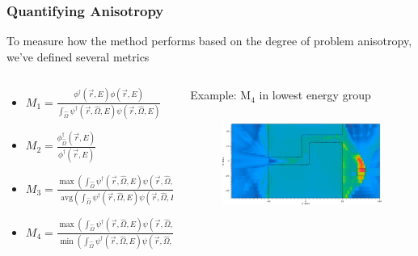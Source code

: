 \documentclass[xcolor=x11names,compress]{beamer}
\renewcommand{\(}{\begin{columns}}
\renewcommand{\)}{\end{columns}}
\newcommand{\<}[1]{\begin{column}{#1}}
\renewcommand{\>}{\end{column}}
\newcommand{\vOmega}{\ensuremath{\hat{\Omega}}}
\newcommand{\vecr}{\vec{r}}
\begin{document}
\begin{frame}[fragile]

  \frametitle{Quantifying Anisotropy}
  
  To measure how the method performs based on the degree of problem anisotropy, we've defined several metrics
  \vspace*{1em}
    \begin{columns}
    \begin{column}{0.45\textwidth}
      \begin{itemize}
      \item $M_{1} = \frac{\phi^{\dagger}(\vecr,E)\phi(\vecr,E)}{\int_{\vOmega}\psi^{\dagger}(\vecr,\vOmega,E)\psi(\vecr,\vOmega,E)}$
      \item $M_{2} = \frac{\phi^{\dagger}_{\vOmega}(\vecr,E)}{\phi^{\dagger}(\vecr,E)}$
      \item $M_{3} = \frac{\max(\int_{\vOmega}\psi^{\dagger}(\vecr,\vOmega,E)\psi(\vecr,\vOmega,E))}{\text{avg}(\int_{\vOmega}\psi^{\dagger}(\vecr,\vOmega,E)\psi(\vecr,\vOmega,E))}$
       \item $M_{4} = \frac{\max(\int_{\vOmega}\psi^{\dagger}(\vecr,\vOmega,E)\psi(\vecr,\vOmega,E))}{\min(\int_{\vOmega}\psi^{\dagger}(\vecr,\vOmega,E)\psi(\vecr,\vOmega,E))}$
      \end{itemize}
    \end{column}    
    \begin{column}{0.55\textwidth}
    Example: M$_4$ in lowest energy group
      	\begin{figure}
  	\begin{center}
  		\includegraphics[height=1.25in,clip]{../figs/maze2M4G26.png}
	\end{center}
  	\end{figure}
    \end{column}
  \end{columns}   

\end{frame}
\end{document}
